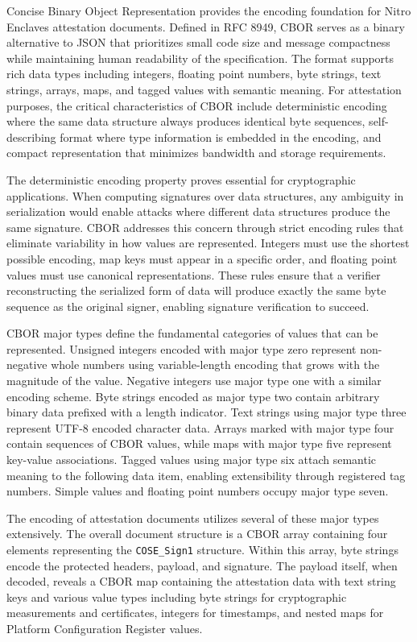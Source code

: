 Concise Binary Object Representation provides the encoding foundation for Nitro Enclaves attestation documents. Defined in RFC 8949, CBOR serves as a binary alternative to JSON that prioritizes small code size and message compactness while maintaining human readability of the specification. The format supports rich data types including integers, floating point numbers, byte strings, text strings, arrays, maps, and tagged values with semantic meaning. For attestation purposes, the critical characteristics of CBOR include deterministic encoding where the same data structure always produces identical byte sequences, self-describing format where type information is embedded in the encoding, and compact representation that minimizes bandwidth and storage requirements.

The deterministic encoding property proves essential for cryptographic applications. When computing signatures over data structures, any ambiguity in serialization would enable attacks where different data structures produce the same signature. CBOR addresses this concern through strict encoding rules that eliminate variability in how values are represented. Integers must use the shortest possible encoding, map keys must appear in a specific order, and floating point values must use canonical representations. These rules ensure that a verifier reconstructing the serialized form of data will produce exactly the same byte sequence as the original signer, enabling signature verification to succeed.

CBOR major types define the fundamental categories of values that can be represented. Unsigned integers encoded with major type zero represent non-negative whole numbers using variable-length encoding that grows with the magnitude of the value. Negative integers use major type one with a similar encoding scheme. Byte strings encoded as major type two contain arbitrary binary data prefixed with a length indicator. Text strings using major type three represent UTF-8 encoded character data. Arrays marked with major type four contain sequences of CBOR values, while maps with major type five represent key-value associations. Tagged values using major type six attach semantic meaning to the following data item, enabling extensibility through registered tag numbers. Simple values and floating point numbers occupy major type seven.

The encoding of attestation documents utilizes several of these major types extensively. The overall document structure is a CBOR array containing four elements representing the \texttt{COSE\_Sign1} structure. Within this array, byte strings encode the protected headers, payload, and signature. The payload itself, when decoded, reveals a CBOR map containing the attestation data with text string keys and various value types including byte strings for cryptographic measurements and certificates, integers for timestamps, and nested maps for Platform Configuration Register values.



